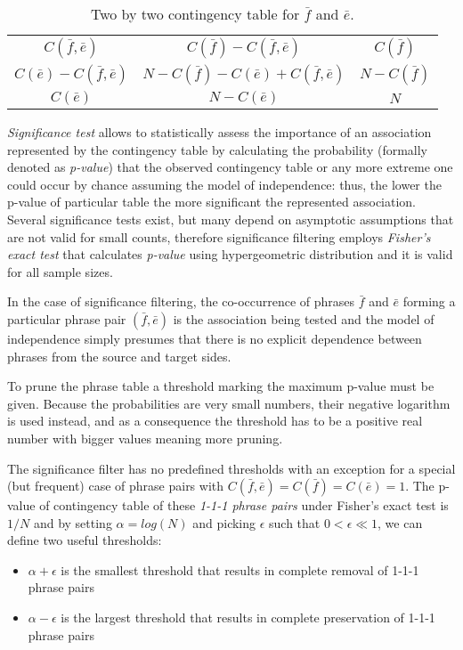 \begin{table}[ht]
\centering
\def\arraystretch{1.5}
\begin{tabular}{ | c c | c | }
\hline
$C(\bar{f},\bar{e})$  &  $C(\bar{f}) - C(\bar{f},\bar{e})$  &  $C(\bar{f})$ \\
$C(\bar{e}) - C(\bar{f},\bar{e})$  &  $N - C(\bar{f}) - C(\bar{e}) + C(\bar{f},\bar{e})$  & $N - C(\bar{f})$ \\
\hline
$C(\bar{e})$  &  $N - C(\bar{e})$  &  $N$ \\
\hline
\end{tabular}
\caption{\label{two-by-two-contingency-table}
Two by two contingency table for $\bar{f}$ and $\bar{e}$.}
\end{table}

\emph{Significance test} allows to statistically assess the importance of an association
represented by the contingency table by calculating the probability (formally denoted
as \emph{p-value}) that the observed contingency table or any more extreme one could
occur by chance assuming the model of independence: thus, the lower the p-value of
particular table the more significant the represented association.
Several significance tests exist, but many depend on asymptotic assumptions
that are not valid for small counts, therefore significance filtering employs
\emph{Fisher's exact test} that calculates \emph{p-value} using hypergeometric
distribution and it is valid for all sample sizes.

In the case of significance filtering, the co-occurrence of phrases $\bar{f}$ and $\bar{e}$
forming a particular phrase pair $(\bar{f},\bar{e})$ is the association being tested
and the model of independence simply presumes that there is no explicit dependence
between phrases from the source and target sides.

To prune the phrase table a threshold marking the maximum p-value must be given.
Because the probabilities are very small numbers, their negative logarithm is used
instead, and as a consequence the threshold has to be a positive real number with
bigger values meaning more pruning.

The significance filter has no predefined thresholds with an exception for a special
(but frequent) case of phrase pairs with $C(\bar{f},\bar{e}) = C(\bar{f}) = C(\bar{e}) = 1$.
The p-value of contingency table of these \emph{1-1-1 phrase pairs} under Fisher's
exact test is $1/N$ and by setting $\alpha = log(N)$ and picking $\epsilon$ such that
$0 < \epsilon \ll 1$, we can define two useful thresholds:
\begin{itemize}
  \item $\alpha + \epsilon$ is the smallest threshold that results in complete removal
    of 1-1-1 phrase pairs
  \item $\alpha - \epsilon$ is the largest threshold that results in complete preservation
    of 1-1-1 phrase pairs
\end{itemize}

